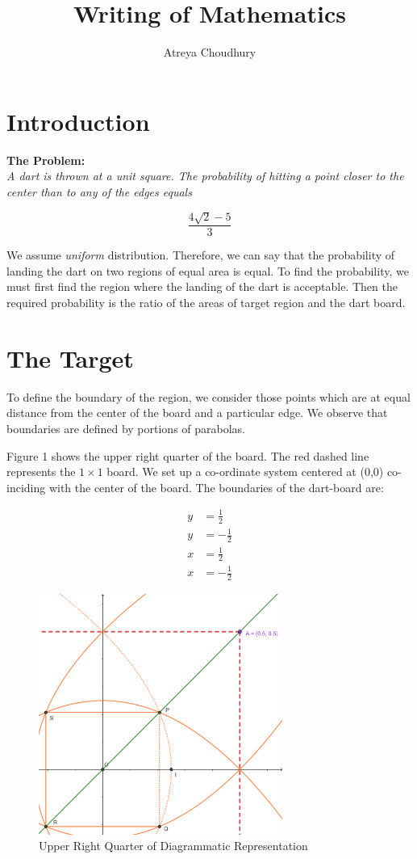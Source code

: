 \documentclass[10pt]{article}
\title{Writing of Mathematics}
\author{Atreya Choudhury}
\begin{document}
\maketitle

\section{Introduction}
\textbf{The Problem:}\\
\textit{A dart is thrown at a unit square. The probability of hitting a point closer to the center than to any of the edges equals}

\begin{equation*}
  \frac{4\sqrt{2}-5}{3}
\end{equation*}

We assume \textit{uniform} distribution. Therefore, we can say that the probability of landing the dart on two regions of equal area is equal. To find the probability, we must first find the region where the landing of the dart is acceptable. Then the required probability is the ratio of the areas of target region and the dart board.

\section{The Target}
To define the boundary of the region, we consider those points which are at equal distance from the center of the board and a particular edge. We observe that boundaries are defined by portions of parabolas.

Figure 1 shows the upper right quarter of the board. The red dashed line represents the $1\times1$ board. We set up a co-ordinate system centered at (0,0) co-inciding with the center of the board. The boundaries of the dart-board are:

\begin{align*}
y &= \frac{1}{2}\\
y &= -\frac{1}{2}\\
x &= \frac{1}{2}\\
x &= -\frac{1}{2}
\end{align*}
\newpage
\begin{figure}[H]
\centering
\includegraphics[width = 8cm]{fig1.png}
\caption{Upper Right Quarter of Diagrammatic Representation}
\end{figure}
\end{document}
